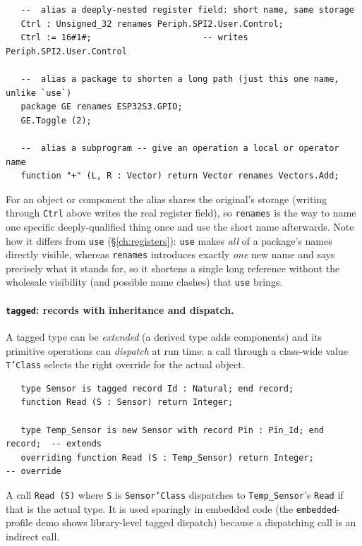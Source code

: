 \begin{lstlisting}
   --  alias a deeply-nested register field: short name, same storage
   Ctrl : Unsigned_32 renames Periph.SPI2.User.Control;
   Ctrl := 16#1#;                      -- writes Periph.SPI2.User.Control

   --  alias a package to shorten a long path (just this one name, unlike `use`)
   package GE renames ESP32S3.GPIO;
   GE.Toggle (2);

   --  alias a subprogram -- give an operation a local or operator name
   function "+" (L, R : Vector) return Vector renames Vectors.Add;
\end{lstlisting}

For an object or component the alias shares the original's storage (writing
through \texttt{Ctrl} above writes the real register field), so \texttt{renames}
is the way to name one specific deeply-qualified thing once and use the short name
afterwards. Note how it differs from \texttt{use} (\S\ref{ch:registers}):
\texttt{use} makes \emph{all} of a package's names directly visible, whereas
\texttt{renames} introduces exactly \emph{one} new name and says precisely what it
stands for, so it shortens a single long reference without the wholesale
visibility (and possible name clashes) that \texttt{use} brings.

\paragraph{\texttt{tagged}: records with inheritance and dispatch.} A tagged
type can be \emph{extended} (a derived type adds components) and its primitive
operations can \emph{dispatch} at run time: a call through a class-wide value
\texttt{T'Class} selects the right override for the actual object.

\begin{lstlisting}
   type Sensor is tagged record Id : Natural; end record;
   function Read (S : Sensor) return Integer;

   type Temp_Sensor is new Sensor with record Pin : Pin_Id; end record;  -- extends
   overriding function Read (S : Temp_Sensor) return Integer;            -- override
\end{lstlisting}

A call \texttt{Read (S)} where \texttt{S} is \texttt{Sensor'Class} dispatches to
\texttt{Temp\_Sensor}'s \texttt{Read} if that is the actual type. It is used
sparingly in embedded code (the \texttt{embedded}-profile demo shows library-level
tagged dispatch) because a dispatching call is an indirect call.

